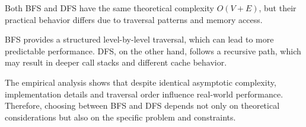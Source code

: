 \documentclass[12pt]{article}
\begin{document}
Both BFS and DFS have the same theoretical complexity \(O(V + E)\), but their practical behavior differs due to traversal patterns and memory access.

BFS provides a structured level-by-level traversal, which can lead to more predictable performance. DFS, on the other hand, follows a recursive path, which may result in deeper call stacks and different cache behavior.

The empirical analysis shows that despite identical asymptotic complexity, implementation details and traversal order influence real-world performance. Therefore, choosing between BFS and DFS depends not only on theoretical considerations but also on the specific problem and constraints.
\end{document}

